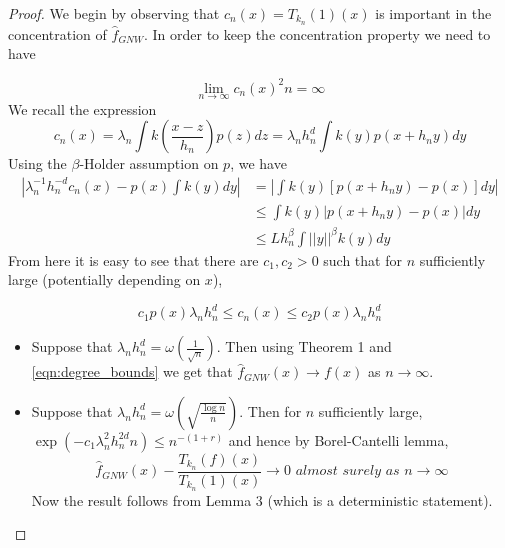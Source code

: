 \documentclass{article}
\begin{document}
\begin{proof}
We begin by observing that $c_n(x)=T_{k_n}(1)(x)$ is important in the concentration of $\hat{f}_{GNW}$. In order to keep the concentration property we need to have


\begin{equation}
\label{eqn:equation_3}
    \lim_{n\rightarrow\infty} c_n(x)^2n=\infty
\end{equation}
We recall the expression
\begin{equation*}
    c_n(x)=\lambda_n\int k(\frac{x-z}{h_n})p(z)dz=\lambda_n h_n^d \int k(y)p(x+h_ny)dy
\end{equation*}
Using the $\beta$-Holder assumption on $p$, we have 
\begin{equation*}
\begin{split}
    |\lambda_n^{-1}h_n^{-d}c_n(x)-p(x)\int k(y)dy|&=|\int k(y)[p(x+h_ny)-p(x)]dy|\\
    &\leq \int k(y)|p(x+h_ny)-p(x)|dy\\
    &\leq Lh_n^{\beta}\int ||y||^{\beta}k(y)dy
\end{split}
\end{equation*}
From here it is easy to see that there are $c_1,c_2>0$ such that for $n$ sufficiently large
(potentially depending on $x$), 

\begin{equation}
\label{eqn:degree_bounds}
    c_1p(x)
    \lambda_nh_n^d\leq c_n(x)\leq c_2p(x) \lambda_nh_n^d
\end{equation}
\begin{itemize}
    \item  Suppose that $\lambda_nh_n^d=\omega(\frac{1}{\sqrt{n}})$. Then using Theorem 1 and \ref{eqn:degree_bounds} we get that $\hat{f}_{GNW}(x)\rightarrow f(x)$ as $n\rightarrow\infty$.
    \item Suppose that $\lambda_nh_n^d=\omega(\sqrt{\frac{\log{n}}{n}})$. Then for $n$ sufficiently large,  $\exp(-c_1\lambda_n^2h_n^{2d}n)\leq n^{-(1+r)}$ and hence by Borel-Cantelli lemma, 
    \begin{equation*}
        \hat{f}_{GNW}(x)-\frac{T_{k_n}(f)(x)}{T_{k_n}(1)(x)}\rightarrow 0 \textit{ almost surely as } n\rightarrow\infty
    \end{equation*}
   Now the result follows from Lemma 3 (which is a deterministic statement).
\end{itemize}
\end{proof}



\printbibliography
\nocite{*}
\end{document}
